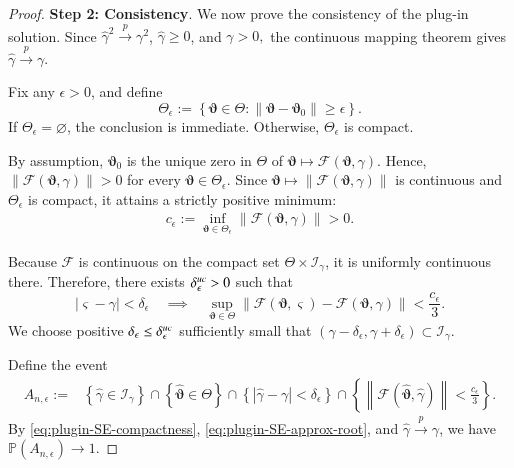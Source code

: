 \documentclass[12pt,reqno]{amsart}
\newcommand{\pr}{\mathbb{P}}
\renewcommand{\hat}{\widehat}
\newcommand{\pconv}{\overset{{p}}{\to}}
\begin{document}
{\begin{proof}
\textbf{Step 2: Consistency}. 
We now prove the consistency of the plug-in solution. Since $\hat\gamma^2\pconv\gamma^2$, $\hat\gamma\ge0$, and $\gamma>0,$
the continuous mapping theorem gives
$\hat\gamma\pconv\gamma.$

Fix any $\epsilon>0$, and define
\[
\Theta_\epsilon
:=
\left\{
\bm\vartheta\in\Theta:
\|\bm\vartheta-\bm\vartheta_0\|\ge\epsilon
\right\}.
\]
If $\Theta_\epsilon=\varnothing$, the conclusion is immediate. Otherwise,
$\Theta_\epsilon$ is compact.

By assumption, $\bm\vartheta_0$ is the unique zero in $\Theta$ of $\bm\vartheta
\mapsto
\mathcal F(\bm\vartheta,\gamma).$
Hence, $\|\mathcal F(\bm\vartheta,\gamma)\|>0$ for every $\bm\vartheta\in\Theta_\epsilon.$
Since
$\bm\vartheta\mapsto
\|\mathcal F(\bm\vartheta,\gamma)\|$
is continuous and $\Theta_\epsilon$ is compact, it attains a strictly
positive minimum:
\begin{align}
c_\epsilon
:=
\inf_{\bm\vartheta\in\Theta_\epsilon}
\|\mathcal F(\bm\vartheta,\gamma)\|
>0.
\label{eq:SE-root-separation}
\end{align}

Because $\mathcal F$ is continuous on the compact set
$\Theta\times\mathcal I_\gamma$, it is uniformly continuous there.
Therefore, there exists $\delta_\epsilon^{\rm uc}>0$ such that
\[
|\varsigma-\gamma|<\delta_\epsilon
\quad\implies\quad
\sup_{\bm\vartheta\in\Theta}
\left\|
\mathcal F(\bm\vartheta,\varsigma)
-
\mathcal F(\bm\vartheta,\gamma)
\right\|
<
\frac{c_\epsilon}{3}.
\]
We choose positive $\delta_\epsilon\le\delta_\epsilon^{\rm uc}$ sufficiently small that $(\gamma-\delta_\epsilon,\gamma+\delta_\epsilon)
\subset\mathcal I_\gamma.$

Define the event
\begin{align}
A_{n,\epsilon}
:=
&
\left\{
\hat\gamma\in\mathcal I_\gamma
\right\}
\cap
\left\{
\hat{\bm\vartheta}\in\Theta
\right\}
\cap
\left\{
|\hat\gamma-\gamma|<\delta_\epsilon
\right\}
\cap
\left\{
\left\|
\mathcal F(\hat{\bm\vartheta},\hat\gamma)
\right\|
<
\frac{c_\epsilon}{3}
\right\}.
\label{eq:SE-consistency-event}
\end{align}
By \eqref{eq:plugin-SE-compactness},
\eqref{eq:plugin-SE-approx-root}, and
$\hat\gamma\pconv\gamma$, we have $\pr(A_{n,\epsilon})\rightarrow1.$


\end{proof}}
\end{document}

